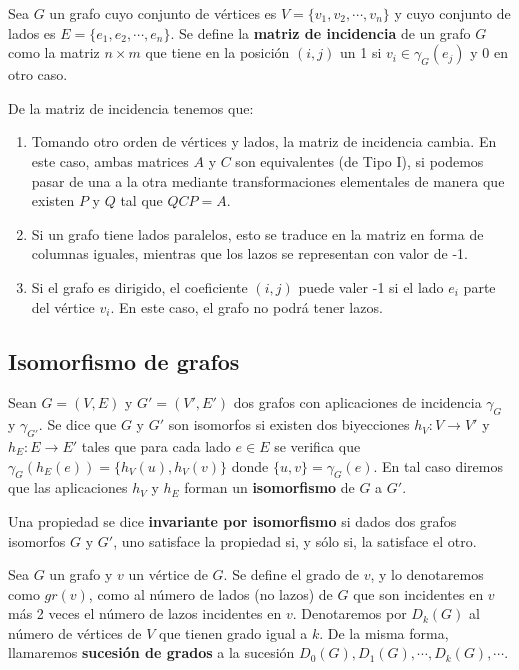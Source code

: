 \begin{ndef}
    Sea $G$ un grafo cuyo conjunto de vértices es $V=\{v_1,v_2,\cdots,v_n\}$ y cuyo conjunto de lados es $E=\{e_1,e_2,\cdots,e_n\}$. Se define la \textbf{matriz de incidencia} de un grafo $G$ como la matriz $n \times m$ que tiene en la posición $(i,j)$ un 1 si $v_i \in \gamma_G(e_j)$ y 0 en otro caso.
\end{ndef}
\begin{obs}
    De la matriz de incidencia tenemos que:
    \begin{enumerate}
        \item Tomando otro orden de vértices y lados, la matriz de incidencia cambia. En este caso, ambas matrices $A$ y $C$ son equivalentes (de Tipo I), si podemos pasar de una a la otra mediante transformaciones elementales de manera que existen $P$ y $Q$ tal que $QCP=A$.
        \item Si un grafo tiene lados paralelos, esto se traduce en la matriz en forma de columnas iguales, mientras que los lazos se representan con valor de -1.
        \item Si el grafo es dirigido, el coeficiente $(i,j)$ puede valer -1 si el lado $e_i$ parte del vértice $v_i$. En este caso, el grafo no podrá tener lazos.
    \end{enumerate}
\end{obs}

\subsection{Isomorfismo de grafos}
\begin{ndef}
    Sean $G=(V,E)$ y $G'=(V',E')$ dos grafos con aplicaciones de incidencia $\gamma_G$ y $\gamma_{G'}$.
    Se dice que $G$ y $G'$ son isomorfos si existen dos biyecciones $h_V: V \rightarrow V'$ y $h_E:E \rightarrow E'$ tales que para cada
    lado $e \in E$ se verifica que $\gamma_G(h_E(e))=\{h_V(u), h_V(v)\}$ donde $\{u,v\}=\gamma_G(e)$.
    En tal caso diremos que las aplicaciones $h_V$ y $h_E$ forman un \textbf{isomorfismo} de $G$ a $G'$.
\end{ndef}

\begin{ndef}
    Una propiedad se dice \textbf{invariante por isomorfismo} si dados dos grafos isomorfos $G$ y $G'$, uno satisface la propiedad si, y sólo si, la satisface el otro.
\end{ndef}

\begin{ndef}
    Sea $G$ un grafo y $v$ un vértice de $G$. Se define el grado de $v$, y lo denotaremos como $gr(v)$,
    como al número de lados (no lazos) de $G$ que son incidentes en $v$ más 2 veces el número de lazos incidentes en $v$.
    Denotaremos por $D_k(G)$ al número de vértices de $V$ que tienen grado igual a $k$. De la misma forma, llamaremos \textbf{sucesión de grados} a la sucesión $D_0(G), D_1(G), \cdots, D_k(G), \cdots$.
\end{ndef}

